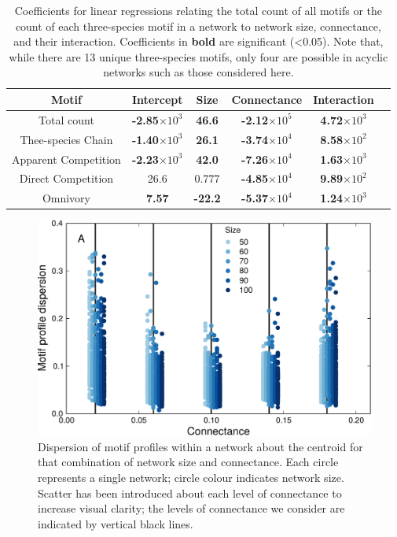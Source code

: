 \documentclass[12pt]{article}
\begin{document}
\begin{spacing}{2.0}
    \begin{table}[h!]
        \centering
        \caption{Coefficients for linear regressions relating the total count of all motifs or the count of each three-species motif in a network to network size, connectance, and their interaction. Coefficients in \textbf{bold} are significant (\textless0.05). Note that, while there are 13 unique three-species motifs, only four are possible in acyclic networks such as those considered here.}
       \label{network_motif_lms}
       \begin{tabular}{c|c c c c c}
        Motif & Intercept & Size & Connectance & Interaction \\
        \hline
        Total count & \textbf{-2.85$\times10^3$} & \textbf{46.6} & \textbf{-2.12$\times10^{5}$} & \textbf{4.72$\times10^{3}$} \\
        \hline
        Thee-species Chain & \textbf{-1.40$\times10^{3}$} & \textbf{26.1} & \textbf{-3.74$\times10^{4}$} & \textbf{8.58$\times10^{2}$} \\
        Apparent Competition & \textbf{-2.23$\times10^3$} & \textbf{42.0} & 
        \textbf{-7.26$\times10^4$} & \textbf{1.63$\times10^3$} \\
        Direct Competition & 26.6 & 0.777 & \textbf{-4.85$\times10^4$} & \textbf{9.89$\times10^2$} \\
        Omnivory & \textbf{7.57} & \textbf{-22.2} & \textbf{-5.37$\times10^4$} & \textbf{1.24$\times10^3$} \\
        \hline
        \end{tabular}
    \end{table}
    
        
    \begin{figure}[h!]
        \centering
        \includegraphics[width=.75\textwidth]{figures/motif_profile_dispersion.pdf}
        \caption{Dispersion of motif profiles within a network about the centroid for that combination of network size and connectance. Each circle represents a single network; circle colour indicates network size. Scatter has been introduced about each level of connectance to increase visual clarity; the levels of connectance we consider are indicated by vertical black lines.}
        \label{dispersion_rawmotifs}
    \end{figure}


\end{spacing}
\end{document}
